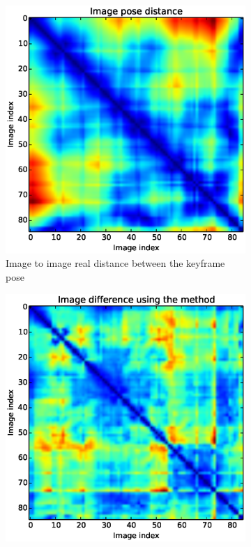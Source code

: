 \begin{figure}
  \begin{subfigure}[b]{0.60\linewidth}
          \includegraphics[width=\linewidth]{img/demo_1_1_CC_real_similarity_matrix.eps}
          \caption{Image to image real distance between the keyframe pose}                
          \label{fig:real_distance_confusion_matrix}
  \end{subfigure}   
  \qquad
  \begin{subfigure}[b]{0.60\linewidth}
         \includegraphics[width=\linewidth]{img/demo_1_1_CC_CC_similarity_matrix.eps}

\end{subfigure}
\end{figure}
